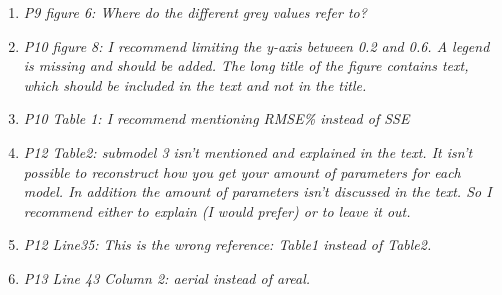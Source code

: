 \documentclass{article}
\begin{document}
\begin{enumerate}
    \answer{}
	
	\item \textit{P9 figure 6: Where do the different grey values refer to? }

    \answer{}

	
	\item \textit{P10 figure 8:  I recommend limiting the y-axis between 0.2 and 0.6. A legend is missing and should be added. The long title of the figure contains text, which should be included in the text and not in the title.}
	
    \answer{}
	
	\item \textit{P10 Table 1: I recommend mentioning RMSE\% instead of SSE}

    \answer{}

	
	\item \textit{P12 Table2: submodel 3 isn’t mentioned and explained in the text. It isn’t possible to reconstruct how you get your amount of parameters for each model. In addition the amount of parameters isn’t discussed in the text. So I recommend either to explain (I would prefer) or to leave it out.}
	
    \answer{}
	
	\item \textit{P12 Line35: This is the wrong reference: Table1 instead of Table2.}

    \answer{}
	
	\item \textit{P13 Line 43 Column 2: aerial instead of areal.}

    \answer{}
	
\end{enumerate}


\end{document}
